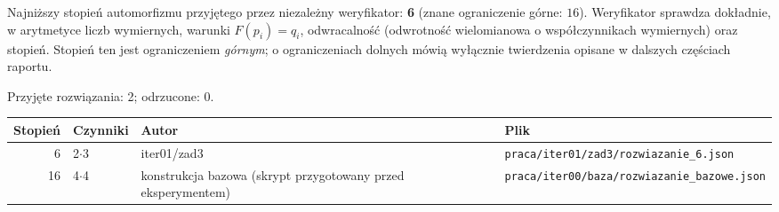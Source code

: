 Najniższy stopień automorfizmu przyjętego przez niezależny weryfikator: \textbf{6} (znane ograniczenie górne: $16$). Weryfikator sprawdza dokładnie, w arytmetyce liczb wymiernych, warunki $F(p_i)=q_i$, odwracalność (odwrotność wielomianowa o współczynnikach wymiernych) oraz stopień. Stopień ten jest ograniczeniem \emph{górnym}; o ograniczeniach dolnych mówią wyłącznie twierdzenia opisane w dalszych częściach raportu.

Przyjęte rozwiązania: 2; odrzucone: 0.
\begin{center}\small\begin{tabular}{rlp{5.2cm}p{5.6cm}}\toprule Stopień & Czynniki & Autor & Plik\\\midrule
6 & 2$\cdot$3 & iter01/zad3 & \texttt{praca/\allowbreak{}iter01/\allowbreak{}zad3/\allowbreak{}rozwiazanie\_6.json}\\
16 & 4$\cdot$4 & konstrukcja bazowa (skrypt przygotowany przed eksperymentem) & \texttt{praca/\allowbreak{}iter00/\allowbreak{}baza/\allowbreak{}rozwiazanie\_bazowe.json}\\
\bottomrule\end{tabular}\end{center}
